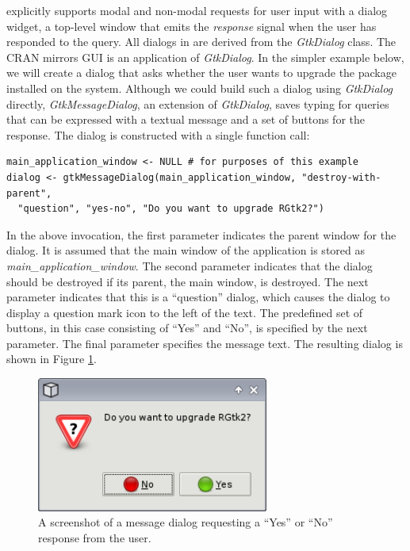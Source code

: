 \documentclass[article]{jss}
\begin{document}
 explicitly supports modal and non-modal requests for user input with
a dialog widget, a top-level window that emits the \emph{response} signal
when the user has responded to the query. All dialogs in  are derived
from the \emph{GtkDialog} class. The CRAN mirrors GUI is an application
of \emph{GtkDialog}. In the simpler example below,
we will create a dialog that asks whether the user wants to upgrade the 
package installed on the system. Although we could build such a dialog using \emph{GtkDialog}
directly, \emph{GtkMessageDialog}, an extension of \emph{GtkDialog}, saves 
typing for queries that can be expressed with a textual message and a set
of buttons for the response. The dialog is constructed with a single function call:
\begin{verbatim}
main_application_window <- NULL # for purposes of this example
dialog <- gtkMessageDialog(main_application_window, "destroy-with-parent", 
  "question", "yes-no", "Do you want to upgrade RGtk2?")
\end{verbatim}
In the above invocation, the first parameter indicates the parent window for
the dialog. It is assumed that the main window of the application is stored 
as \emph{main\_application\_window}. The second parameter indicates that
the dialog should be destroyed if its parent, the main window, is destroyed.
The next parameter indicates that this is a ``question'' dialog, which causes
the dialog to display a question mark icon to the left of the text. The 
predefined set of buttons, in this case consisting of ``Yes'' and ``No'', 
is specified by the next parameter. The final parameter specifies the message text.
The resulting dialog is shown in Figure \ref{fig:upgrade-dialog}.

\begin{figure}
\begin{center}
\includegraphics[width=3in]{upgrade-dialog.png}
\caption{\label{fig:upgrade-dialog}A screenshot of a message dialog requesting a 
``Yes'' or ``No'' response from the user.}
\end{center}
\end{figure}
\end{document}
